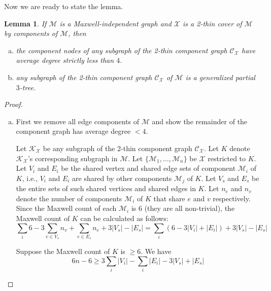 \documentclass[10pt]{article}
\def\M{\mathcal {M}}
\def\X{\mathcal {X}}
\def\C{\mathscr{C}}
\def\K{\mathscr{K}}
\newtheorem{lem}{Lemma}
\begin{document}
Now we are ready to state the lemma. \begin{lem}\label{lem:comb} If $\M$ is a Maxwell-independent graph and $\X$ is a 2-thin cover of $\M$ by components of $\M$, then
\begin{enumerate}[(a)]
\item \label{thm:degree}
the component nodes of any subgraph of the 2-thin component graph $\C_{\X}$ have average degree strictly less than $4$.
 \item \label{thm:9tree}
any subgraph of the 2-thin component graph $\C_{\X}$ of $\M$ is a generalized partial $3$-tree.
 \end{enumerate}
\end{lem}
\begin{proof}
\begin{enumerate}[(a)]
\item\label{lem:comb1} First we remove all edge components of $\M$ and show the remainder of the component graph has average degree $<4$.

Let $\K_{\X}$ be any subgraph of the 2-thin component graph $\C_{\X}$. Let $K$ denote $\K_{\X}$'s corresponding subgraph in $\M$.
Let $\{\M_1, \ldots, \M_n\}$ be $\X$ restricted to $K$. Let $V_i$ and $E_i$ be the shared vertex and shared edge sets of component $\M_i$ of $K$, i.e., $V_i$ and $E_i$ are shared by other components $\M_j$ of $K$. Let $V_s$ and $E_s$ be the entire sets of such shared vertices and shared edges in $K$. Let $n_e$ and $n_v$ denote the number of components $\M_i$ of $K$ that share $e$ and $v$ respectively. Since the Maxwell count of each $\M_i$ is $6$ (they are all non-trivial), the Maxwell count of $K$ can be calculated as follows:
\begin{equation*}
\sum_{i} 6 - 3\sum\limits_{v\in V_s}n_v +\sum\limits_{e\in E_s}n_e + 3|V_s|-|E_s|=\sum_{i}(6- 3|V_i|+|E_i|)+ 3|V_s|-|E_s|
\end{equation*}

Suppose the Maxwell count of $K$ is $\geq 6$. We have
\begin{equation}\label{eqn:MC}
6n - 6 \geq 3\sum\limits_{i} |V_i| -\sum\limits_{i} |E_i| -3|V_s|+|E_s|
\end{equation}



\end{enumerate}
\end{proof}
\end{document}
